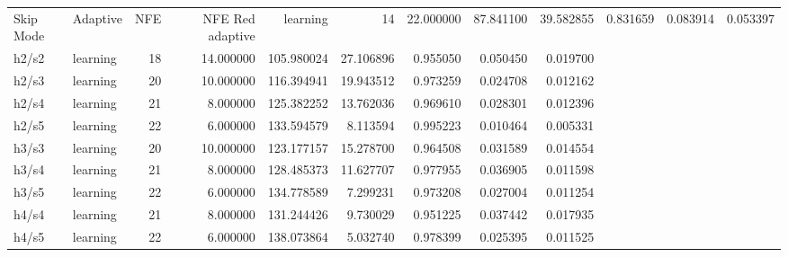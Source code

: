 \begin{tabular}{llrrrrrrr}
\toprule
Skip Mode & Adaptive & NFE & NFE Red %
\midrule
adaptive & learning & 14 & 22.000000 & 87.841100 & 39.582855 & 0.831659 & 0.083914 & 0.053397 \\
h2/s2 & learning & 18 & 14.000000 & 105.980024 & 27.106896 & 0.955050 & 0.050450 & 0.019700 \\
h2/s3 & learning & 20 & 10.000000 & 116.394941 & 19.943512 & 0.973259 & 0.024708 & 0.012162 \\
h2/s4 & learning & 21 & 8.000000 & 125.382252 & 13.762036 & 0.969610 & 0.028301 & 0.012396 \\
h2/s5 & learning & 22 & 6.000000 & 133.594579 & 8.113594 & 0.995223 & 0.010464 & 0.005331 \\
h3/s3 & learning & 20 & 10.000000 & 123.177157 & 15.278700 & 0.964508 & 0.031589 & 0.014554 \\
h3/s4 & learning & 21 & 8.000000 & 128.485373 & 11.627707 & 0.977955 & 0.036905 & 0.011598 \\
h3/s5 & learning & 22 & 6.000000 & 134.778589 & 7.299231 & 0.973208 & 0.027004 & 0.011254 \\
h4/s4 & learning & 21 & 8.000000 & 131.244426 & 9.730029 & 0.951225 & 0.037442 & 0.017935 \\
h4/s5 & learning & 22 & 6.000000 & 138.073864 & 5.032740 & 0.978399 & 0.025395 & 0.011525 \\
\bottomrule
\end{tabular}
